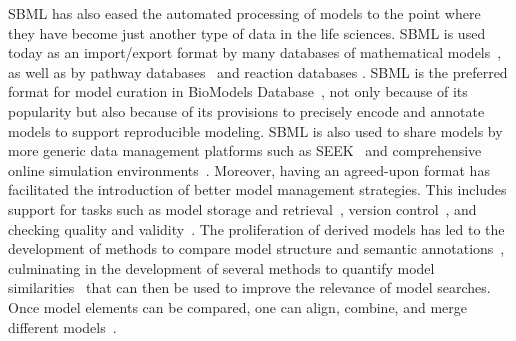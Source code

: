 \documentclass{sbml-paper}
\begin{document}
SBML has also eased the automated processing of models to the point where they have become just another type of data in the life sciences.  SBML is used today as an import/export format by many databases of mathematical models~\citep{Malik-Sheriff2020biomodels, Norsigian2019, Misirli2014composable}, as well as by pathway databases~\citep{caspi2015metacyc, mi_2016, fabregat2017reactome} and reaction databases \citep{ganter2013metanetx, wittig2017sabio}.  SBML is the preferred format for model curation in BioModels Database~\citep{Malik-Sheriff2020biomodels}, not only because of its popularity but also because of its provisions to precisely encode and annotate models to support reproducible modeling.  SBML is also used to share models by more generic data management platforms such as SEEK~\citep{wolstencroft2016fairdomhub} and comprehensive online simulation environments~\citep[e.g.,][]{Moraru2008virtual, peters2017jws, Weidemann2008sycamore, Lee2009webbased}.  Moreover, having an agreed-upon format has facilitated the introduction of better model management strategies.  This includes support for tasks such as model storage and retrieval~\citep{Henkel2015combininga}, version control~\citep{Scharm2016algorithm}, and checking quality and validity~\citep{Liebermeister2008validity, Lieven2020memote}.  The proliferation of derived models has led to the development of methods to compare model structure and semantic annotations~\citep{Lambusch2018identifying}, culminating in the development of several methods to quantify model similarities~\citep{henkel2016notions} that can then be used to improve the relevance of model searches.  Once model elements can be compared, one can align, combine, and merge different models~\citep{krause2010annotation}.
 
\end{document}
